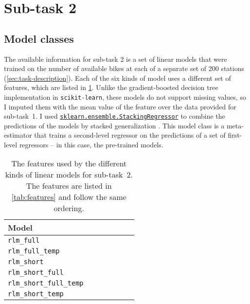 \documentclass[11pt]{extarticle}
\newcommand{\bikesavgfull}{\texttt{bikes\_avg\_full}}
\newcommand{\bikesavgshort}{\texttt{bikes\_avg\_short}}
\newcommand{\bikesh}{\texttt{bikes\_3h}}
\newcommand{\bikeshdiffavgfull}{\texttt{bikes\_3h\_diff\_avg\_full}}
\newcommand{\bikeshdiffavgshort}{\texttt{bikes\_3h\_diff\_avg\_short}}
\newcommand{\rlmfull}{\texttt{rlm\_full}}
\newcommand{\rlmfulltemp}{\texttt{rlm\_full\_temp}}
\newcommand{\rlmshort}{\texttt{rlm\_short}}
\newcommand{\rlmshortfull}{\texttt{rlm\_short\_full}}
\newcommand{\rlmshortfulltemp}{\texttt{rlm\_short\_full\_temp}}
\newcommand{\rlmshorttemp}{\texttt{rlm\_short\_temp}}
\newcommand{\sklearn}[2]{\href{https://scikit-learn.org/stable/modules/generated/sklearn.#1.#2.html}{\lstinline|sklearn.#1.#2|}}
\begin{document}
\section{Sub-task 2}
\label{sec:subtask-2}

\subsection{Model classes}
\label{sec:subtask-2:model-classes}

The available information for sub-task 2 is a set of linear models that were trained on
the number of available bikes at each of a separate set of 200 stations
(\cref{sec:task-description}).
Each of the six kinds of model uses a different set of features, which are listed in
\cref{tab:2:features}.
Unlike the gradient-boosted decision tree implementation in \texttt{scikit-learn},
these models do not support missing values, so I imputed them with the mean value of
the feature over the data provided for sub-task~1.
I used \sklearn{ensemble}{StackingRegressor} to combine the predictions of the models
by stacked generalization \parencite{Wolpert1992}.
This model class is a meta-estimator that trains a second-level regressor on the
predictions of a set of first-level regressors -- in this case, the pre-trained models.

\begin{table}
  \centering
  \newcommand{\rlmtablerow}[7]{#1 & #7 & #2 & #3 & #4 & #5 & #6 \\}
  \begin{tabular}{lllllll}

    \rlmtablerow{Model}{\rot{\bikesh{}}}{\rot{\bikesavgfull{}}}{\rot{\bikesavgshort{}}}{\rot{\bikeshdiffavgfull{}}}{\rot{\bikeshdiffavgshort{}}}{\rot{\texttt{temperature}}}

    \midrule

    \rlmtablerow{\rlmfull{}}{\checkmark}{\checkmark}{}{\checkmark}{}{}

    \rlmtablerow{\rlmfulltemp{}}{\checkmark}{\checkmark}{}{\checkmark}{}{\checkmark}

    \rlmtablerow{\rlmshort{}}{\checkmark}{}{\checkmark}{}{\checkmark}{}

    \rlmtablerow{\rlmshortfull{}}{\checkmark}{\checkmark}{\checkmark}{\checkmark}{\checkmark}{}

    \rlmtablerow{\rlmshortfulltemp{}}{\checkmark}{\checkmark}{\checkmark}{\checkmark}{\checkmark}{\checkmark}

    \rlmtablerow{\rlmshorttemp{}}{\checkmark}{}{\checkmark}{}{\checkmark}{\checkmark}

    \bottomrule
  \end{tabular}
  \caption{The features used by the different kinds of linear
    models for sub-task~2.
    The features are listed in \cref{tab:features} and follow the same ordering.
  }
  \label{tab:2:features}
\end{table}
\end{document}
